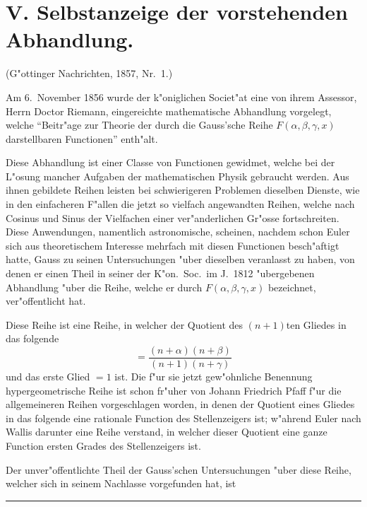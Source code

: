 \documentclass[12pt,a4paper]{article}
\begin{document}
\section*{V. Selbstanzeige der vorstehenden Abhandlung.}

\begin{center}
\small
(G{"o}ttinger Nachrichten, 1857, Nr.~1.)
\end{center}
\vspace{0.5em}

Am 6.~November 1856 wurde der k{"o}niglichen Societ{"a}t eine von ihrem Assessor, Herrn Doctor Riemann, eingereichte mathematische Abhandlung vorgelegt, welche ``Beitr{"a}ge zur Theorie der durch die Gauss'sche Reihe $F(\alpha, \beta, \gamma, x)$ darstellbaren Functionen'' enth{"a}lt.

Diese Abhandlung ist einer Classe von Functionen gewidmet, welche bei der L{"o}sung mancher Aufgaben der mathematischen Physik gebraucht werden. Aus ihnen gebildete Reihen leisten bei schwierigeren Problemen dieselben Dienste, wie in den einfacheren F{"a}llen die jetzt so vielfach angewandten Reihen, welche nach Cosinus und Sinus der Vielfachen einer ver{"a}nderlichen Gr{"o}sse fortschreiten. Diese Anwendungen, namentlich astronomische, scheinen, nachdem schon Euler sich aus theoretischem Interesse mehrfach mit diesen Functionen besch{"a}ftigt hatte, Gauss zu seinen Untersuchungen {"u}ber dieselben veranlasst zu haben, von denen er einen Theil in seiner der K{"o}n.\ Soc.\ im J.\ 1812 {"u}bergebenen Abhandlung {"u}ber die Reihe, welche er durch $F(\alpha, \beta, \gamma, x)$ bezeichnet, ver{"o}ffentlicht hat.

Diese Reihe ist eine Reihe, in welcher der Quotient des $(n + 1)$ten Gliedes in das folgende
\[
= \frac{(n + \alpha)(n + \beta)}{(n + 1)(n + \gamma)}
\]
und das erste Glied $= 1$ ist. Die f{"u}r sie jetzt gew{"o}hnliche Benennung hypergeometrische Reihe ist schon fr{"u}her von Johann Friedrich Pfaff f{"u}r die allgemeineren Reihen vorgeschlagen worden, in denen der Quotient eines Gliedes in das folgende eine rationale Function des Stellenzeigers ist; w{"a}hrend Euler nach Wallis darunter eine Reihe verstand, in welcher dieser Quotient eine ganze Function ersten Grades des Stellenzeigers ist.

Der unver{"o}ffentlichte Theil der Gauss'schen Untersuchungen {"u}ber diese Reihe, welcher sich in seinem Nachlasse vorgefunden hat, ist 

\vspace{2em}
\begin{center}
\rule{0.5\textwidth}{0.4pt}
\end{center}

\vspace{1em}
\tableofcontents
\end{document}
